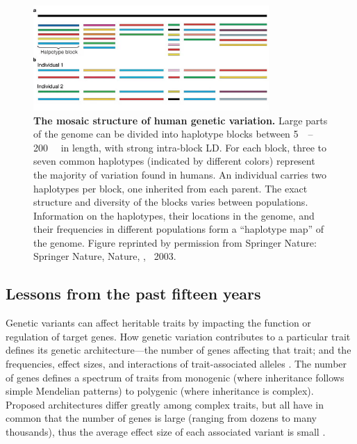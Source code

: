 \begin{outline}
\begin{figure}
    \centering
    \includegraphics[width=0.8\textwidth,page=1]{mainmatter/figures/chapter_01/paabo2003MosaicThatOur/41586_2003_Article_BFnature01400_Fig3_HTML.png}
    \caption{
        \textbf{The mosaic structure of human genetic variation.}
        Large parts of the genome can be divided into haplotype blocks between \SIrange{5}{200}{\kilo\bp} in length, with strong intra-block \gls{LD}.
        For each block, three to seven common haplotypes (indicated by different colors) represent the majority of variation found in humans.
        An individual carries two haplotypes per block, one inherited from each parent.
        The exact structure and diversity of the blocks varies between populations.
        Information on the haplotypes, their locations in the genome, and their frequencies in different populations form a \enquote{haplotype map} of the genome.
        Figure reprinted by permission from Springer Nature: Springer Nature, Nature, \textcite{paabo2003MosaicThatOur}, \textcopyright~2003.
    }
    \label{fig:intro_haplotypeBlocks}
\end{figure}

\subsection{Lessons from the past fifteen years}

Genetic variants can affect heritable traits by impacting the function or regulation of target genes.
How genetic variation contributes to a particular trait defines its genetic architecture---the number of genes affecting that trait; and the frequencies, effect sizes, and interactions of trait-associated alleles \autocite{visscher2019Fisher1918Paper}.
The number of genes defines a spectrum of traits from monogenic (where inheritance follows simple Mendelian patterns) to polygenic (where inheritance is complex).
Proposed architectures differ greatly among complex traits, 
but all have in common that the number of genes is large (ranging from dozens to many thousands),
thus the average effect size of each associated variant is small \autocite{hindorff2009PotentialEtiologicFunctional,gibson2011RareCommonVariants,boyle2017ExpandedViewComplex}.


\end{outline}
